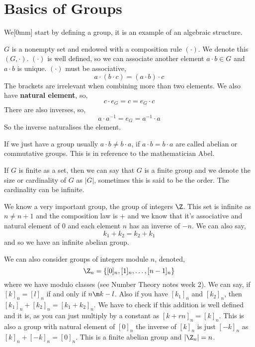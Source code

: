 
\section{Basics of Groups}
We[0mm] start by defining a group, it is an example of an algebraic structure.
\begin{ndefi}[Group]
  $G$ is a nonempty set and endowed with a composition rule $(\cdot)$. We denote this $(G, \cdot)$. $(\cdot)$ is well defined, so we can associate another element $a \cdot b \in G$ and $a \cdot b$ is unique. $(\cdot)$ must be associative,
  $$ a \cdot (b \cdot c) = (a \cdot b) \cdot c $$
  The brackets are irrelevant when combining more than two elements. We also have \textbf{natural element}, so,
  $$ c \cdot e_G = c = e_G \cdot c $$
  There are also inverses, so,
  $$ a \cdot a^{-1} = e_G = a^{-1} \cdot a $$
  So the inverse naturalises the element.
\end{ndefi}

\noindent
If we just have a group usually $a \cdot b \ne b \cdot a$, if $a \cdot b = b \cdot a$ are called abelian or commutative groups. This is in reference to the mathematician Abel.

\noindent
If $G$ is finite as a set, then we can say that $G$ is a finite group and we denote the size or cardinality of $G$ as $|G|$, sometimes this is said to be the order. The cardinality can be infinite.\\

\noindent
\begin{eg}
  We know a very important group, the group of integers $\Z$. This set is infinite as $n \ne n + 1$ and the composition law is $+$ and we know that it's associative and natural element of $0$ and each element $n$ has an inverse of $-n$. We can also say,
  $$ k_1 + k_2 = k_2 + k_1 $$
  and so we have an infinite abelian group.
\end{eg}

\begin{eg}
  We can also consider groups of integers module $n$, denoted,
  $$ \Z_n = \{[0]_n, [1]_n, \dots, [n-1]_n\} $$
  where we have modulo classes (see Number Theory notes week 2). We can say, if $[k]_n = [l]_n$ if and only if $n \m k - l$. Also if you have $[k_1]_n$ and $[k_2]_n$, then $[k_1]_n + [k_2]_n = [k_1 + k_2]_n$. We have to check if this addition is well defined and it is, as you can just multiply by a constant as $[k+ rn]_n = [k]_n$. This is also a group with natural element of $[0]_n$ the inverse of $[k]_n$ is just $[-k]_n$ as $[k]_n + [-k]_n = [0]_n$. This is a finite abelian group and $|\Z_n| = n$.
\end{eg}

